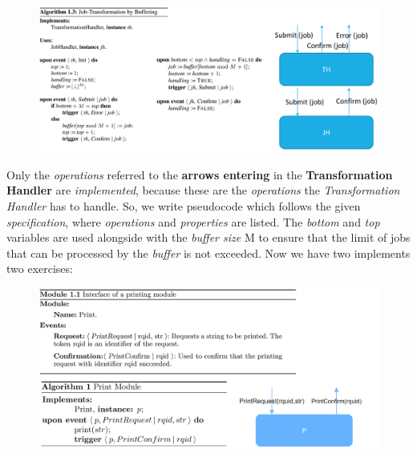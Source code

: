 \documentclass{article}
\begin{document}
\begin{figure}[H]
  \centering
  \includegraphics[scale=0.48, left]{cattura5.png}
\end{figure}
\hfill \break
Only the \emph{operations} referred to the \textbf{arrows entering} in the \textbf{Transformation Handler} are \emph{implemented}, because these are the \emph{operations} the \emph{Transformation Handler} has to handle. So, we write pseudocode which follows the given \emph{specification}, where \emph{operations} and \emph{properties} are listed. The \emph{bottom} and \emph{top} variables are used alongside with the \emph{buffer size} M to ensure that the limit of jobs that can be processed by the \emph{buffer} is not exceeded. Now we have two implements two exercises: 
\begin{figure}[H]
  \centering
  \includegraphics[scale=0.7, left]{cattura6.png}
\end{figure}
\end{document}

